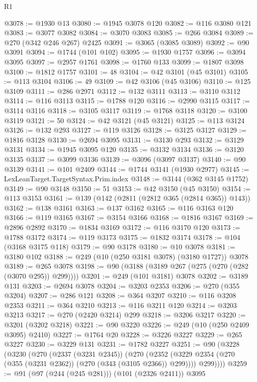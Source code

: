 \begin{lexlean}{R1}
\begin{coremodule}
@3078 := @1930 @13
@3080 := @1945 @3078 @120
@3082 := @116 @3080 @121
@3083 := @3077 @3082
@3084 := @3070 @3083
@3085 := @266 @3084
@3089 := @270 (@342 @246 @267) @2425
@3091 := @3065 (@3085 @3089)
@3092 := @90 @3091
@3094 := @1744 (@101 @102)
@3095 := @1930 @1757
@3096 := @3094 @3095
@3097 := @2957 @1761
@3098 := @1760 @133
@3099 := @1807 @3098
@3100 := @1812 @1757
@3101 := 48
@3104 := @42 @3101 (@45 @3101)
@3105 := @113 @3104
@3106 := 49
@3109 := @42 @3106 (@45 @3106)
@3110 := @125 @3109
@3111 := @286 @2971
@3112 := @132 @3111
@3113 := @3110 @3112
@3114 := @116 @3113
@3115 := @1788 @120
@3116 := @2990 @3115
@3117 := @3114 @3116
@3118 := @3105 @3117
@3119 := @1768 @3118
@3120 := @3100 @3119
@3121 := 50
@3124 := @42 @3121 (@45 @3121)
@3125 := @113 @3124
@3126 := @132 @293
@3127 := @119 @3126
@3128 := @3125 @3127
@3129 := @1816 @3128
@3130 := @2694 @3095
@3131 := @3130 @293
@3132 := @3129 @3131
@3134 := @1945 @3095 @120
@3135 := @3132 @3134
@3136 := @3120 @3135
@3137 := @3099 @3136
@3139 := @3096 (@3097 @3137)
@3140 := @90 @3139
@3141 := @101 @2409
@3144 := @1744 @3141 (@1930 @2977)
@3145 := LexLeanTarget.TargetSyntax.Prim.index
@3148 := @3144 (@362 @3145 @1752)
@3149 := @90 @3148
@3150 := 51
@3153 := @42 @3150 (@45 @3150)
@3154 := @113 @3153
@3161 := @139 (@142 (@2811 (@2812 @365 (@2814 @365)) @143))
@3162 := @138 @3161
@3163 := @137 @3162
@3165 := @116 @3163 @120
@3166 := @119 @3165
@3167 := @3154 @3166
@3168 := @1816 @3167
@3169 := @2896 @2892
@3170 := @1834 @3169
@3172 := @116 @3170 @120
@3173 := @1788 @3172
@3174 := @119 @3173
@3175 := @1832 @3174
@3178 := @104 (@3168 @3175 @118)
@3179 := @90 @3178
@3180 := @10 @3078
@3181 := @3180 @102
@3188 := @249 (@10 (@250 @3181 @3078) (@3180 @1727)) @3078
@3189 := @265 @3078
@3198 := @90 (@3188 (@3189 @267 (@275 (@270 (@282 (@3070 @295)) @299))))
@3201 := @249 (@101 @3181) @3078
@3202 := @3189 @131
@3203 := @2694 @3078
@3204 := @3203 @2353
@3206 := @270 (@355 @3204)
@3207 := @286 @121
@3208 := @364 @3207
@3210 := @116 @3208 @2353
@3211 := @364 @3210
@3213 := @116 @3211 @120
@3214 := @3203 @3213
@3217 := @270 (@2420 @3214) @299
@3218 := @3206 @3217
@3220 := @3201 (@3202 @3218)
@3221 := @90 @3220
@3226 := @249 (@10 (@250 @2409 @3095) @2410)
@3227 := @1764 @20
@3228 := @3226 @3227
@3229 := @265 @3227
@3230 := @3229 @131
@3231 := @1782 @3227
@3251 := @90
    (@3228
      (@3230
        (@270
          (@2337 (@3231 @2345))
          (@270
            (@2352 (@3229 @2354 (@270 (@355 (@3231 @2362)) (@270 (@343 (@3105 @2366)) @299))))
            @299))))
@3259 := @91 (@97 (@244 (@245 @281))) (@101 (@2326 @2411)) @3095

\end{coremodule}
\end{lexlean}
